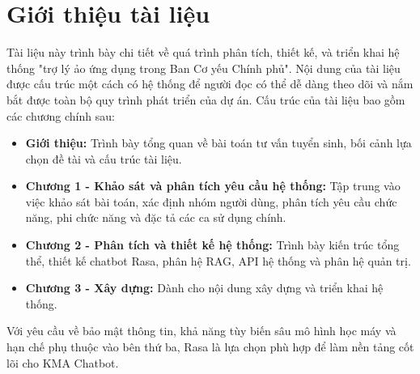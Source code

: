 \section{Giới thiệu tài liệu}
\label{sec:document_introduction}
Tài liệu này trình bày chi tiết về quá trình phân tích, thiết kế, và triển khai hệ thống "trợ lý ảo ứng dụng trong Ban Cơ yếu Chính phủ". Nội dung của tài liệu được cấu trúc một cách có hệ thống để người đọc có thể dễ dàng theo dõi và nắm bắt được toàn bộ quy trình phát triển của dự án. Cấu trúc của tài liệu bao gồm các chương chính sau:
\begin{itemize}
    \item \textbf{Giới thiệu:} Trình bày tổng quan về bài toán tư vấn tuyển sinh, bối cảnh lựa chọn đề tài và cấu trúc tài liệu.
    \item \textbf{Chương 1 - Khảo sát và phân tích yêu cầu hệ thống:} Tập trung vào việc khảo sát bài toán, xác định nhóm người dùng, phân tích yêu cầu chức năng, phi chức năng và đặc tả các ca sử dụng chính.
    \item \textbf{Chương 2 - Phân tích và thiết kế hệ thống:} Trình bày kiến trúc tổng thể, thiết kế chatbot Rasa, phân hệ RAG, API hệ thống và phân hệ quản trị.
    \item \textbf{Chương 3 - Xây dựng:} Dành cho nội dung xây dựng và triển khai hệ thống.
\end{itemize}


Với yêu cầu về bảo mật thông tin, khả năng tùy biến sâu mô hình học máy và hạn chế phụ thuộc vào bên thứ ba, Rasa là lựa chọn phù hợp để làm nền tảng cốt lõi cho KMA Chatbot.
